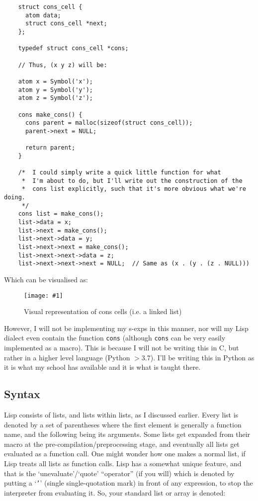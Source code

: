 \documentclass{article}
\newcommand{\code}[1]{\texttt{#1}}
\newcommand{\graph}[2]{
  \begin{figure}[H]
    \centering
    \texttt{[image: \#1]}
    \caption{#2}
  \end{figure}
}
\begin{document}
    \begin{verbatim}
    struct cons_cell {
      atom data;
      struct cons_cell *next;
    };

    typedef struct cons_cell *cons;

    // Thus, (x y z) will be:

    atom x = Symbol('x');
    atom y = Symbol('y');
    atom z = Symbol('z');

    cons make_cons() {
      cons parent = malloc(sizeof(struct cons_cell));
      parent->next = NULL;

      return parent;
    }

    /*  I could simply write a quick little function for what
     *  I'm about to do, but I'll write out the construction of the
     *  cons list explicitly, such that it's more obvious what we're doing.
     */
    cons list = make_cons();
    list->data = x;
    list->next = make_cons();
    list->next->data = y;
    list->next->next = make_cons();
    list->next->next->data = z;
    list->next->next->next = NULL;  // Same as (x . (y . (z . NULL)))
    \end{verbatim}

    Which can be visualised as:
    \graph{cons-cells}{Visual representation of cons cells (i.e. a linked list)}


    However, I will not be implementing my s-exps in this manner, nor
    will my Lisp dialect even contain the function \code{cons}
    (although \code{cons} can be very easily implemented as a macro).
    This is  because I will not be writing this in C, but rather in a higher
    level language (Python $>$3.7).  I'll be writing this in Python as it is
    what my school has available and it is what is taught there.

  \subsection{Syntax}
    Lisp consists of lists, and lists within lists,
    as I discussed earlier. Every list is denoted by a set of
    parentheses where the first element is generally a function name, and the
    following being its arguments. Some lists get expanded from their macro at
    the pre-compilation/preprocessing stage,
    and eventually all lists get evaluated as a
    function call. One might wonder how one makes a normal list, if Lisp treats
    all lists as function calls. Lisp has a somewhat unique feature, and that is
    the `unevaluate'/`quote' ``operator'' (if you will) which is denoted by
    putting
    a `\code{'}' (single single-quotation mark)
    in front of any expression, to stop the interpreter from evaluating it.
    So, your standard list or array is denoted:
\end{document}
